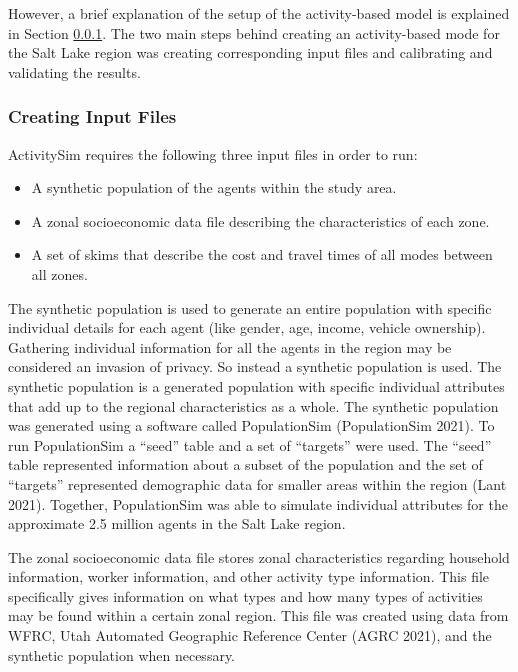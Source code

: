 \documentclass[12pt, oneside, openright]{byuthesis}
\providecommand{\tightlist}{%
  \setlength{\itemsep}{0pt}\setlength{\parskip}{0pt}}
\begin{document}
However, a brief explanation of the setup of the activity-based model is explained in Section \ref{asiminput}. The two main steps behind creating an activity-based mode for the Salt Lake region was creating corresponding input files and calibrating and validating the results.

\hypertarget{asiminput}{%
\subsubsection{Creating Input Files}\label{asiminput}}

ActivitySim requires the following three input files in order to run:

\begin{itemize}
\tightlist
\item
  A synthetic population of the agents within the study area.
\item
  A zonal socioeconomic data file describing the characteristics of each zone.
\item
  A set of skims that describe the cost and travel times of all modes between all zones.
\end{itemize}

The synthetic population is used to generate an entire population with specific individual details for each agent (like gender, age, income, vehicle ownership). Gathering individual information for all the agents in the region may be considered an invasion of privacy. So instead a synthetic population is used. The synthetic population is a generated population with specific individual attributes that add up to the regional characteristics as a whole. The synthetic population was generated using a software called PopulationSim (PopulationSim 2021). To run PopulationSim a ``seed'' table and a set of ``targets'' were used. The ``seed'' table represented information about a subset of the population and the set of ``targets'' represented demographic data for smaller areas within the region (Lant 2021). Together, PopulationSim was able to simulate individual attributes for the approximate 2.5 million agents in the Salt Lake region.

The zonal socioeconomic data file stores zonal characteristics regarding household information, worker information, and other activity type information. This file specifically gives information on what types and how many types of activities may be found within a certain zonal region. This file was created using data from WFRC, Utah Automated Geographic Reference Center (AGRC 2021), and the synthetic population when necessary.
\end{document}

